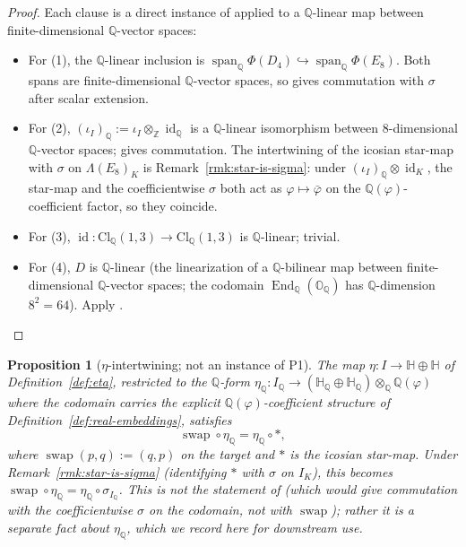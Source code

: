 \documentclass[11pt, a4paper]{amsart}
\newtheorem{proposition}[theorem]{Proposition}
\theoremstyle{definition}
\newcommand{\Q}{\mathbb{Q}}
\newcommand{\Z}{\mathbb{Z}}
\newcommand{\HH}{\mathbb{H}}
\newcommand{\OO}{\mathbb{O}}
\newcommand{\id}{\operatorname{id}}
\newcommand{\Cl}{\mathrm{Cl}}
\begin{document}
\begin{proof}
Each clause is a direct instance of
\cite[Thm.~4.5]{SigmaRationality} applied to a $\Q$-linear map
between finite-dimensional $\Q$-vector spaces:
\begin{itemize}
\item For (1), the $\Q$-linear inclusion is
  $\operatorname{span}_\Q \Phi(D_4) \hookrightarrow
  \operatorname{span}_\Q \Phi(E_8)$. Both spans are
  finite-dimensional $\Q$-vector spaces, so
  \cite[Thm.~4.5]{SigmaRationality} gives commutation with
  $\sigma$ after scalar extension.
\item For (2), $(\iota_I)_\Q := \iota_I \otimes_\Z \id_\Q$ is a
  $\Q$-linear isomorphism between $8$-dimensional $\Q$-vector
  spaces; \cite[Thm.~4.5]{SigmaRationality} gives commutation. The
  intertwining of the icosian star-map with $\sigma$ on
  $\Lambda(E_8)_K$ is Remark~\ref{rmk:star-is-sigma}: under
  $(\iota_I)_\Q \otimes \id_K$, the star-map and the
  coefficientwise $\sigma$ both act as $\varphi \mapsto
  \bar\varphi$ on the $\Q(\varphi)$-coefficient factor, so they
  coincide.
\item For (3), $\id \colon \Cl_\Q(1,3) \to \Cl_\Q(1,3)$ is
  $\Q$-linear; trivial.
\item For (4), $D$ is $\Q$-linear (the linearization of a
  $\Q$-bilinear map between finite-dimensional $\Q$-vector spaces;
  the codomain $\operatorname{End}_\Q(\OO_\Q)$ has $\Q$-dimension
  $8^2 = 64$). Apply \cite[Thm.~4.5]{SigmaRationality}.
\end{itemize}
\end{proof}

\begin{proposition}[$\eta$-intertwining; not an instance of P1]
\label{prop:eta-swap}
The map $\eta \colon I \to \HH \oplus \HH$ of
Definition~\ref{def:eta}, restricted to the $\Q$-form
$\eta_\Q \colon I_\Q \to (\HH_\Q \oplus \HH_\Q)
\otimes_\Q \Q(\varphi)$ where the codomain carries the explicit
$\Q(\varphi)$-coefficient structure of
Definition~\ref{def:real-embeddings}, satisfies
\[
  \operatorname{swap} \circ \eta_\Q
  = \eta_\Q \circ \ast,
\]
where $\operatorname{swap}(p, q) := (q, p)$ on the target and
$\ast$ is the icosian star-map. Under
Remark~\ref{rmk:star-is-sigma} (identifying $\ast$ with $\sigma$
on $I_K$), this becomes
$\operatorname{swap} \circ \eta_\Q = \eta_\Q \circ \sigma_{I_\Q}$.
This is \emph{not} the statement of
\cite[Thm.~4.5]{SigmaRationality} (which would give commutation
with the coefficientwise $\sigma$ on the codomain, not with
$\operatorname{swap}$); rather it is a separate fact about
$\eta_\Q$, which we record here for downstream use.
\end{proposition}
\end{document}
